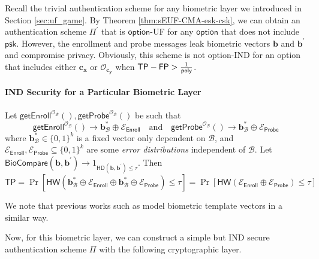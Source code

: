 Recall the trivial authentication scheme for any biometric layer we introduced in Section \ref{sec:uf_game}. By Theorem \ref{thm:sEUF-CMA-esk-csk}, we can obtain an authentication scheme $\Pi^\prime$ that is $\textsf{option}$-UF for any $\textsf{option}$ that does not include $\textsf{psk}$.
However, the enrollment and probe messages leak biometric vectors $\mathbf{b}$ and $\mathbf{b}^\prime$ and compromise privacy. Obviously, this scheme is not \textsf{option}-IND for an \textsf{option} that includes either $\mathbf{c_x}$ or $\mathcal{O}_{\mathbf{c_y}}$ when $\textsf{TP} - \textsf{FP} > \frac{1}{\mathsf{poly}}$.

\paragraph{IND Security for a Particular Biometric Layer}

Let $\textsf{getEnroll}^{\mathcal{O}_{\mathcal{B}}}(), \textsf{getProbe}^{\mathcal{O}_{\mathcal{B}}}()$ be such that
\[
	\textsf{getEnroll}^{\mathcal{O}_{\mathcal{B}}}() \to \mathbf{b}^*_{\mathcal{B}} \oplus \mathcal{E}_{\textsf{Enroll}}  \quad \text{and} \quad \textsf{getProbe}^{\mathcal{O}_{\mathcal{B}}}() \to \mathbf{b}^*_{\mathcal{B}} \oplus \mathcal{E}_{\textsf{Probe}}
\]
where $\mathbf{b}^*_{\mathcal{B}} \in \{0, 1\}^k$ is a fixed vector only dependent on $\mathcal{B}$, and $\mathcal{E}_{\textsf{Enroll}}, \mathcal{E}_{\textsf{Probe}} \subseteq \{0, 1\}^k$ are some \emph{error distributions} independent of $\mathcal{B}$. Let $\textsf{BioCompare}(\mathbf{b}, \mathbf{b}^\prime) \to 1_{\textsf{HD}(\mathbf{b}, \mathbf{b}^\prime) \leq \tau}$. Then
\[
	\textsf{TP} = \Pr[ \textsf{HW}(\mathbf{b}^*_{\mathcal{B}} \oplus \mathcal{E}_{\textsf{Enroll}} \oplus \mathbf{b}^*_{\mathcal{B}} \oplus \mathcal{E}_{\textsf{Probe}}) \leq \tau ] = \Pr[ \textsf{HW}(\mathcal{E}_{\textsf{Enroll}} \oplus \mathcal{E}_{\textsf{Probe}}) \leq \tau ]
\]

\noindent We note that previous works such as \cite{10.1145/1030083.1030096,cryptoeprint:2014/394} model biometric template vectors in a similar way.

Now, for this biometric layer, we can construct a simple but IND secure authentication scheme $\Pi$ with the following cryptographic layer.

